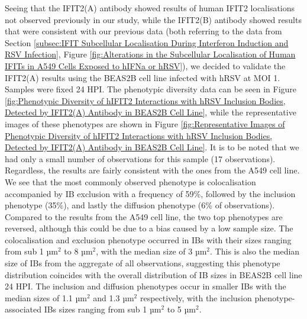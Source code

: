 Seeing that the IFIT2(A) antibody showed results of human IFIT2 localisations not observed previously in our study, while the IFIT2(B) antibody showed results that were consistent with our previous data (both referring to the data from Section \ref{subsec:IFIT Subcellular Localisation During Interferon Induction and RSV Infection}, Figure \ref{fig:Alterations in the Subcellular Localisation of Human IFITs in A549 Cells Exposed to hIFNa or hRSV}), we decided to validate the IFIT2(A) results using the BEAS2B cell line infected with hRSV at MOI 1. Samples were fixed 24 HPI. The phenotypic diversity data can be seen in Figure \ref{fig:Phenotypic Diversity of hIFIT2 Interactions with hRSV Inclusion Bodies, Detected by IFIT2(A) Antibody in BEAS2B Cell Line}, while the representative images of these phenotypes are shown in Figure \ref{fig:Representative Images of Phenotypic Diversity of hIFIT2 Interactions with hRSV Inclusion Bodies, Detected by IFIT2(A) Antibody in BEAS2B Cell Line}. It is to be noted that we had only a small number of observations for this sample (17 observations). Regardless, the results are fairly consistent with the ones from the A549 cell line. We see that the most commonly observed phenotype is colocalisation accompanied by IB exclusion with a frequency of 59\%, followed by the inclusion phenotype (35\%), and lastly the diffusion phenotype (6\% of observations). Compared to the results from the A549 cell line, the two top phenotypes are reversed, although this could be due to a bias caused by a low sample size. The colocalisation and exclusion phenotype occurred in IBs with their sizes ranging from sub 1 \(\mbox{µm}^2\) to 8 \(\mbox{µm}^2\), with the median size of 3 \(\mbox{µm}^2\). This is also the median size of IBs from the aggregate of all observations, suggesting this phenotype distribution coincides with the overall distribution of IB sizes in BEAS2B cell line 24 HPI. The inclusion and diffusion phenotypes occur in smaller IBs with the median sizes of 1.1 \(\mbox{µm}^2\) and 1.3 \(\mbox{µm}^2\) respectively, with the inclusion phenotype-associated IBs sizes ranging from sub 1 \(\mbox{µm}^2\) to 5 \(\mbox{µm}^2\).

